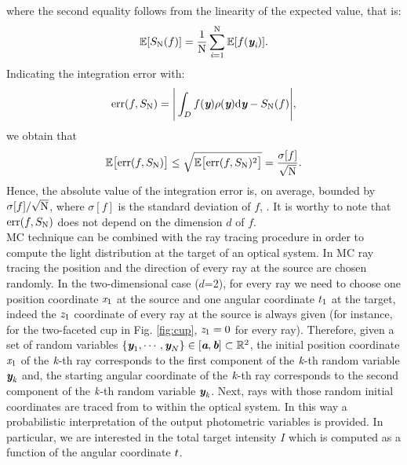 where the second equality follows from the linearity of the expected value, that is:
\begin{equation}
\mathbb{E}[S_{\textrm{N}}(f)] = \frac{1}{\textrm{N}}\sum_{\textit{i}=1}^{\textrm{N}}\mathbb{E}[ f(\textit{\textbf{y}}_{\textit{i}})].
\end{equation}
Indicating the integration error with:
\begin{equation}
\textrm{err}(f, S_{\textrm{N}}) =\Bigg|\int_{D}f(\textit{\textbf{y}})\rho(\textit{\textbf{y}}) \textrm{d}\textit{\textbf{y}}-S_{\textrm{N}}(f)\Bigg|,
\end{equation}
we obtain that
\begin{equation}\label{eq:mean_error}
\mathbb{E}\big[\textrm{err}(f, S_{\textrm{N}})\big]\leq\sqrt{\mathbb{E}\big[\textrm{err}(f, S_{\textrm{N}})^2\big]} = \frac{\sigma[f]}{\sqrt{\textrm{N}}}.
\end{equation}
Hence, the absolute value of the integration error is, on average, bounded by $\sigma[f]/\sqrt{\textrm{N}}$, where $\sigma[f]$ is the standard deviation of $f$, \cite{leobacher2014introduction}. It is worthy to note that $\textrm{err}(f, S_{\textrm{N}})$ does not depend on the dimension $d$ of $f$.
\\ \indent MC technique can be combined with the ray tracing procedure in order to compute the light distribution at the target of an optical system.
In MC ray tracing the position and the direction of  every ray at the source are chosen randomly. 
In the two-dimensional case ($d$=2), for every ray we need to choose one position coordinate $\textit{x}_1$ at the source and one angular coordinate $t_1$ at the target, indeed the $\textit{z}_1$ coordinate of every ray at the source is always given (for instance, for the two-faceted cup in Fig. \ref{fig:cup}, $\textit{z}_1=0$ for every ray). 
Therefore, given a set of random variables $\{\textit{\textbf{y}}_1, \cdots, \textit{\textbf{y}}_N\}\in [\textit{\textbf{a}}, \textit{\textbf{b}}]\subset\mathbb{R}^2$, the initial position coordinate $\textit{x}_1$ of the $\textit{k}$-th ray corresponds to the first component of the $\textit{k}$-th random variable $\textit{\textbf{y}}_{\textit{k}}$ and, the starting angular coordinate of the $\textit{k}$-th ray corresponds to the second component of the $\textit{k}$-th random variable $\textit{\textbf{y}}_{\textit{k}}$.
Next, rays with those random initial coordinates are traced from  to  within the optical system.
In this way a probabilistic interpretation of the output photometric variables is provided.
In particular, we are interested in the total target intensity $I$ which is computed as a function of the angular coordinate $t$.
